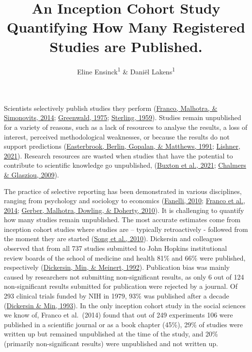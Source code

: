 \documentclass[
  ,jou, a4paper,floatsintext]{apa6}
\title{An Inception Cohort Study Quantifying How Many Registered Studies are Published.}
\author{Eline Ensinck\textsuperscript{1} \& Daniël Lakens\textsuperscript{1}}
\date{}
\affiliation{\vspace{0.5cm}\textsuperscript{1} Eindhoven University of Technology}
\begin{document}
\maketitle

Scientists selectively publish studies they perform (\protect\hyperlink{ref-franco_publication_2014}{Franco, Malhotra, \& Simonovits, 2014}; \protect\hyperlink{ref-greenwald_consequences_1975}{Greenwald, 1975}; \protect\hyperlink{ref-sterling_publication_1959}{Sterling, 1959}). Studies remain unpublished for a variety of reasons, such as a lack of resources to analyse the results, a loss of interest, perceived methodological weaknesses, or because the results do not support predictions (\protect\hyperlink{ref-easterbrook_publication_1991}{Easterbrook, Berlin, Gopalan, \& Matthews, 1991}; \protect\hyperlink{ref-lishner_sorting_2021}{Lishner, 2021}). Research resources are wasted when studies that have the potential to contribute to scientific knowledge go unpublished, (\protect\hyperlink{ref-buxton_avoiding_2021}{Buxton et al., 2021}; \protect\hyperlink{ref-chalmers_avoidable_2009}{Chalmers \& Glasziou, 2009}).

The practice of selective reporting has been demonstrated in various disciplines, ranging from psychology and sociology to economics (\protect\hyperlink{ref-fanelli_positive_2010}{Fanelli, 2010}; \protect\hyperlink{ref-franco_publication_2014}{Franco et al., 2014}; \protect\hyperlink{ref-gerber_publication_2010}{Gerber, Malhotra, Dowling, \& Doherty, 2010}). It is challenging to quantify how many studies remain unpublished. The most accurate estimates come from inception cohort studies where studies are -- typically retroactively - followed from the moment they are started (\protect\hyperlink{ref-song_dissemination_2010}{Song et al., 2010}). Dickersin and colleagues observed that from all 737 studies submitted to John Hopkins institutional review boards of the school of medicine and health 81\% and 66\% were published, respectively (\protect\hyperlink{ref-dickersin_factors_1992}{Dickersin, Min, \& Meinert, 1992}). Publication bias was mainly caused by researchers not submitting non-significant results, as only 6 out of 124 non-significant results submitted for publication were rejected by a journal. Of 293 clinical trials funded by NIH in 1979, 93\% was published after a decade (\protect\hyperlink{ref-dickersin_nih_1993}{Dickersin \& Min, 1993}). In the only inception cohort study in the social sciences we know of, Franco et al.~(2014) found that out of 249 experiments 106 were published in a scientific journal or as a book chapter (45\%), 29\% of studies were written up but remained unpublished at the time of the study, and 20\% (primarily non-significant results) were unpublished and not written up.
\end{document}

